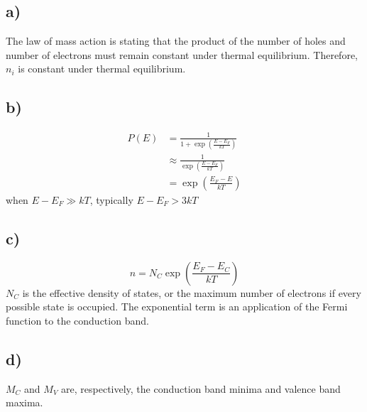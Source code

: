 \subsection*{a)}
The law of mass action is stating that the product of the number of holes and number of electrons must remain constant under thermal equilibrium.
Therefore, $n_i$ is constant under thermal equilibrium.
\subsection*{b)}
\[
\begin{aligned}
P(E) &= \frac{1}{1+\exp\left(\frac{E-E_F}{k T}\right)} \\
&\approx \frac{1}{\exp\left(\frac{E-E_F}{k T}\right)} \\
&= \exp\left(\frac{E_F - E}{k T}\right)
\end{aligned}
\]
when $E - E_F \gg k T$, typically $E - E_F > 3 k T $
\subsection*{c)}
$$n = N_C \exp \left(\frac{E_F - E_C}{k T} \right)$$
$N_C$ is the effective density of states, or the maximum number of electrons if every possible state is occupied.
The exponential term is an application of the Fermi function to the conduction band.
\subsection*{d)}
$M_C$ and $M_V$ are, respectively, the conduction band minima and valence band maxima. %